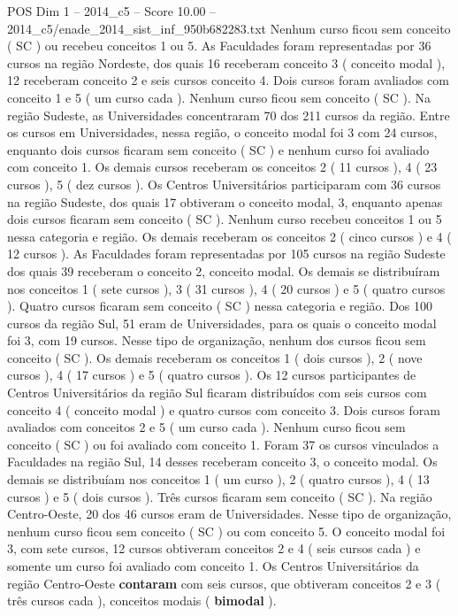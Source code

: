 \begin{textsample}{POS Dim 1 – 2014\_c5 – Score 10.00 – 2014\_c5/enade\_2014\_sist\_inf\_950b682283.txt}
Nenhum curso ficou sem conceito ( SC ) ou recebeu conceitos 1 ou 5.
As Faculdades foram representadas por 36 cursos na região Nordeste, dos quais 16 receberam conceito 3 ( conceito modal ), 12 receberam conceito 2 e seis cursos conceito 4.
Dois cursos foram avaliados com conceito 1 e 5 ( um curso cada ).
Nenhum curso ficou sem conceito ( SC ).
Na região Sudeste, as Universidades concentraram 70 dos 211 cursos da região.
Entre os cursos em Universidades, nessa região, o conceito modal foi 3 com 24 cursos, enquanto dois cursos ficaram sem conceito ( SC ) e nenhum curso foi avaliado com conceito 1.
Os demais cursos receberam os conceitos 2 ( 11 cursos ), 4 ( 23 cursos ), 5 ( dez cursos ).
Os Centros Universitários participaram com 36 cursos na região Sudeste, dos quais 17 obtiveram o conceito modal, 3, enquanto apenas dois cursos ficaram sem conceito ( SC ).
Nenhum curso recebeu conceitos 1 ou 5 nessa categoria e região.
Os demais receberam os conceitos 2 ( cinco cursos ) e 4 ( 12 cursos ).
As Faculdades foram representadas por 105 cursos na região Sudeste dos quais 39 receberam o conceito 2, conceito modal.
Os demais se distribuíram nos conceitos 1 ( sete cursos ), 3 ( 31 cursos ), 4 ( 20 cursos ) e 5 ( quatro cursos ).
Quatro cursos ficaram sem conceito ( SC ) nessa categoria e região.
Dos 100 cursos da região Sul, 51 eram de Universidades, para os quais o conceito modal foi 3, com 19 cursos.
Nesse tipo de organização, nenhum dos cursos ficou sem conceito ( SC ).
Os demais receberam os conceitos 1 ( dois cursos ), 2 ( nove cursos ), 4 ( 17 cursos ) e 5 ( quatro cursos ).
Os 12 cursos participantes de Centros Universitários da região Sul ficaram distribuídos com seis cursos com conceito 4 ( conceito modal ) e quatro cursos com conceito 3.
Dois cursos foram avaliados com conceitos 2 e 5 ( um curso cada ).
Nenhum curso ficou sem conceito ( SC ) ou foi avaliado com conceito 1.
Foram 37 os cursos vinculados a Faculdades na região Sul, 14 desses receberam conceito 3, o conceito modal.
Os demais se distribuíam nos conceitos 1 ( um curso ), 2 ( quatro cursos ), 4 ( 13 cursos ) e 5 ( dois cursos ).
Três cursos ficaram sem conceito ( SC ).
Na região Centro-Oeste, 20 dos 46 cursos eram de Universidades.
Nesse tipo de organização, nenhum curso ficou sem conceito ( SC ) ou com conceito 5.
O conceito modal foi 3, com sete cursos, 12 cursos obtiveram conceitos 2 e 4 ( seis cursos cada ) e somente um curso foi avaliado com conceito 1.
Os Centros Universitários da região Centro-Oeste \textbf{contaram} com seis cursos, que obtiveram conceitos 2 e 3 ( três cursos cada ), conceitos modais ( \textbf{bimodal} ).

\end{textsample}
